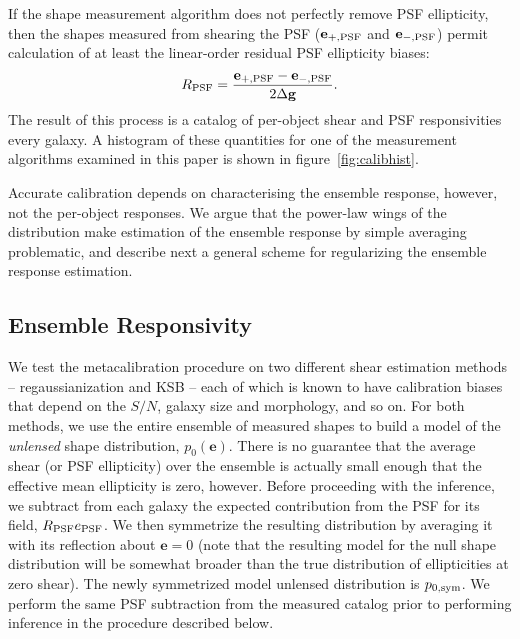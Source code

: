 \documentclass[iop]{emulateapj}
\begin{document}
If the shape measurement algorithm does not perfectly remove PSF
ellipticity, then the shapes measured from shearing the PSF
($\mathbf{e}_{+,\rm PSF}$ and $\mathbf{e}_{-,\rm PSF}$) permit
calculation of at least the linear-order residual PSF ellipticity
biases:
\begin{align}
R_{\rm PSF} = \frac{\mathbf{e}_{+,\rm PSF} - \mathbf{e}_{-,\rm PSF}}{2\Delta\mathbf{g}}.
\end{align}
The result of this process is a catalog of per-object shear and PSF
responsivities every galaxy.  A histogram of these quantities for one
of the measurement algorithms examined in this paper is shown in
figure~\ref{fig:calibhist}. 

Accurate calibration depends on characterising the ensemble response,
however, not the per-object responses. We argue that the power-law
wings of the distribution make estimation of the ensemble response by
simple averaging problematic, and describe next a general scheme for
regularizing the ensemble response estimation.

\subsection{Ensemble Responsivity}
We test the metacalibration procedure on two different shear
estimation methods -- regaussianization and KSB -- each of which is
known to have calibration biases that depend on the $S/N$, galaxy size
and morphology, and so on. For both methods, we use the entire
ensemble of measured shapes to build a model of the {\it unlensed}
shape distribution, $p_0(\mathbf{e})$. There is no guarantee that the
average shear (or PSF ellipticity) over the ensemble is actually small
enough that the effective mean ellipticity is zero, however. Before
proceeding with the inference, we subtract from each galaxy the
expected contribution from the PSF for its field,
$R_{\rm PSF}e_{\rm PSF}$. We then symmetrize the resulting
distribution by averaging it with its reflection about $\mathbf{e}=0$
(note that the resulting model for the null shape distribution will be
somewhat broader than the true distribution of ellipticities at zero
shear). The newly symmetrized model unlensed distribution is
$p_{0,\rm sym}$. We perform the same PSF subtraction from the measured
catalog prior to performing inference in the procedure described
below.
\end{document}
